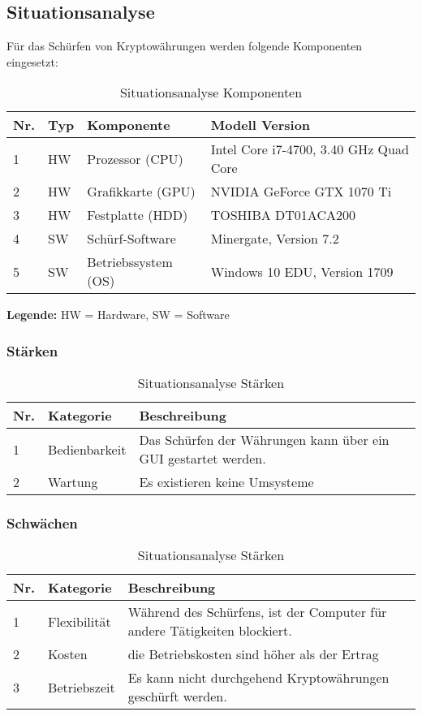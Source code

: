 \subsection{Situationsanalyse}
Für das Schürfen von Kryptowährungen werden folgende Komponenten eingesetzt:
\begin{table}[H]
\begin{tabular}[t]{p{0.5cm}p{0.8cm}p{6.7cm}p{6.7cm}}
\hline
\rowcolor{heading}\textbf{Nr.} & \textbf{Typ} & \textbf{Komponente} & \textbf{Modell \/Version} \\\hline
1 & HW & Prozessor (CPU) & Intel Core i7-4700, 3.40 GHz Quad Core \\\hline
2 & HW & Grafikkarte (GPU) & NVIDIA GeForce GTX 1070 Ti  \\\hline
3 & HW & Festplatte (HDD) & TOSHIBA DT01ACA200  \\\hline
4 & SW & Schürf-Software & Minergate, Version 7.2  \\\hline
5 & SW & Betriebssystem (OS) & Windows 10 EDU, Version 1709 \\\hline
\end{tabular}
\caption{Situationsanalyse Komponenten}
\end{table}


\textbf{Legende:} HW = Hardware, SW = Software

\subsubsection{Stärken}
\begin{table}[H]
\begin{tabular}[t]{p{0.5cm}p{4.1cm}p{10.1cm}}
\hline
\rowcolor{heading}\textbf{Nr.} & \textbf{Kategorie} & \textbf{Beschreibung} \\\hline
1 & Bedienbarkeit & Das Schürfen der Währungen kann über ein GUI gestartet werden. \\\hline
2 & Wartung & Es existieren keine Umsysteme  \\\hline
\end{tabular}
\caption{Situationsanalyse Stärken}
\end{table}

\subsubsection{Schwächen}
\begin{table}[H]
\begin{tabular}[t]{p{0.5cm}p{4.1cm}p{10.1cm}}
\hline
\rowcolor{heading}\textbf{Nr.} & \textbf{Kategorie} & \textbf{Beschreibung} \\\hline
1 & Flexibilität & Während des Schürfens, ist der Computer für andere Tätigkeiten blockiert. \\\hline
2 & Kosten & die Betriebskosten sind höher als der Ertrag  \\\hline
3 & Betriebszeit & Es kann nicht durchgehend Kryptowährungen geschürft werden.  \\\hline
\end{tabular}
\caption{Situationsanalyse Stärken}
\end{table}
